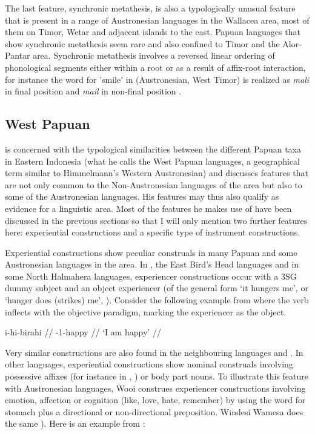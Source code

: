 The last feature, synchronic metathesis, is also a typologically unusual feature that is present in a range of Austronesian languages in the Wallacea area, most of them on Timor, Wetar and adjacent islands to the east. Papuan languages that show synchronic metathesis seem rare and also confined to Timor and the Alor-Pantar area. Synchronic metathesis involves a reversed linear ordering of phonological segments either within a root or as a result of affix-root interaction, for instance the word for 'smile' in  (Austronesian, West Timor) is realized as \textit{mali} in final position and \textit{mail} in non-final position \citep[134ff.]{schapper2015wallacea}.

\subsection{West Papuan}\label{sec:westpapuan}

\citet{reesink2005west} is concerned with the typological similarities between the different Papuan taxa in Eastern Indonesia (what he calls the West Papuan languages, a geographical term similar to Himmelmann's Western Austronesian) and discusses features that are not only common to the Non-Austronesian languages of the area but also to some of the Austronesian languages. His features may thus also qualify as evidence for a linguistic area. Most of the features he makes use of have been discussed in the previous sections so that I will only mention two further features here: experiential constructions and a specific type of instrument constructions. 

Experiential constructions show peculiar construals in many Papuan and some Austronesian languages in the area. In , the East Bird's Head languages and in some North Halmahera languages, experiencer constructions occur with a 3SG dummy subject and an object experiencer  (of the general form `it hungers me', or `hunger does (strikes) me', \citealt[191]{reesink2005west}). Consider the following example from  where the verb inflects with the objective paradigm, marking the experiencer as the object.

\ex \label{}
\begingl
\gla i-hi-birahi // 
-1-happy //
\glft `I am happy' // 
\endgl
\xe

Very similar constructions are also found in the neighbouring languages  and . In other languages, experiential constructions show nominal construals involving possessive affixes (for instance in , \citealt[192]{reesink2005west}) or body part nouns. To illustrate this feature with Austronesian languages, Wooi construes experiencer constructions involving emotion, affection or cognition (like, love, hate, remember) by using the word for stomach plus a directional or non-directional preposition. Windesi Wamesa does the same \citep[154]{gasser2014windesi}). Here is an example from :

